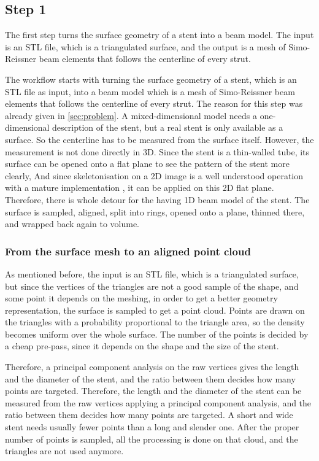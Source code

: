 \subsection{Step 1}
\label{sec:step-1}

The first step turns the surface geometry of a stent into a beam model. The input is an STL file, which is a triangulated surface, and the output is a mesh of Simo-Reissner beam elements that follows the centerline of every strut. 

The workflow starts with turning the surface geometry of a stent, which is an STL file as input, into a beam model which is a mesh of Simo-Reissner beam elements that follows the centerline of every strut. The reason for this step was already given in \cref{sec:problem}. A mixed-dimensional model needs a one-dimensional description of the stent, but a real stent is only available as a surface. So the centerline has to be measured from the surface itself. However, the measurement is not done directly in 3D. Since the stent is a thin-walled tube, its surface can be opened onto a flat plane to see the pattern of the stent more clearly, And since skeletonisation on a 2D image is a well understood operation with a mature implementation \citep{scikitimage}, it can be applied on this 2D flat plane. Therefore, there is whole detour for the having 1D beam model of the stent. The surface is sampled, aligned, split into rings, opened onto a plane, thinned there, and wrapped back again to volume.

\subsubsection{From the surface mesh to an aligned point cloud}
\label{sec:substep1-sampling}

As mentioned before, the input is an STL file, which is a triangulated surface, but since the vertices of the triangles are not a good sample of the shape, and some point it depends on the meshing, in order to get a better geometry representation, the surface is sampled to get a point cloud. Points are drawn on the triangles with a probability proportional to the triangle area, so the density becomes uniform over the whole surface. The number of the points is decided by a cheap pre-pass, since it depends on the shape and the size of the stent. 

Therefore, a principal component analysis on the raw vertices gives the length and the diameter of the stent, and the ratio between them decides how many points are targeted. Therefore, the length and the diameter of the stent can be measured from the raw vertices applying a principal component analysis, and the ratio between them decides how many points are targeted. A short and wide stent needs usually fewer points than a long and slender one. After the proper number of points is sampled, all the processing is done on that cloud, and the triangles are not used anymore.

